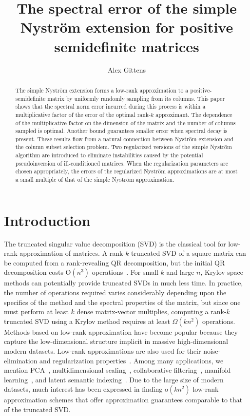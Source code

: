 \documentclass[11pt,letterpaper,twoside,reqno,nosumlimits]{amsart}
\title[The simple Nystr\"om extension]{The spectral error of the simple Nystr\"om extension for positive semidefinite matrices}
\author{Alex Gittens}
\newcommand{\const}[1]{\ensuremath{\mathrm{#1}}}
\theoremstyle{remark}
\begin{document}
\begin{abstract}The simple Nystr\"om extension forms a low-rank approximation to a positive-semidefinite matrix by uniformly randomly sampling from its columns. This paper shows that the spectral norm error incurred during this process is within a multiplicative factor of the error of the optimal rank-$k$ approximant. The dependence of the multiplicative factor on the dimension of the matrix and the number of columns sampled is optimal. Another bound guarantees smaller error when spectral decay is present. These results flow from a natural connection between Nystr\"om extension and the column subset selection problem. Two regularized versions of the simple Nystr\"om algorithm are introduced to eliminate instabilities caused by the potential pseudoinversion of ill-conditioned matrices. When the regularization parameters are chosen appropriately, the errors of the regularized Nystr\"om approximations are at most a small multiple of that of the simple Nystr\"om approximation.
\end{abstract}
\maketitle


\section{Introduction}
The truncated singular value decomposition (SVD) is the classical tool for low-rank approximation of matrices. A rank-$k$ truncated SVD of a square matrix can be computed from a rank-revealing QR decomposition, but the initial QR decomposition costs $\mathrm{O}(n^3)$ operations~\cite{CH92}. For small $k$ and large $n$, Krylov space methods can potentially provide truncated SVDs in much less time. In practice, the number of operations required varies considerably depending upon the specifics of the method and the spectral properties of the matrix, but since one must perform at least $k$ dense matrix-vector multiplies, computing a rank-$k$ truncated SVD using a Krylov method requires at least $\Omega(kn^2)$ operations. Methods based on low-rank approximation have become popular because they capture the low-dimensional structure implicit in massive high-dimensional modern datasets. Low-rank approximations are also used for their noise-elimination and regularization properties~\cite{H90}. Among many applications, we mention PCA~\cite{HTF08}, multidimensional scaling~\cite{CC00}, collaborative filtering~\cite{SAJ10}, manifold learning~\cite{HLMS04}, and latent semantic indexing~\cite{DDFLH90}. Due to the large size of modern datasets, much interest has been expressed in finding $\const{o}(kn^2)$ low-rank 
approximation schemes that offer approximation guarantees comparable to that of the truncated SVD.
\end{document}
